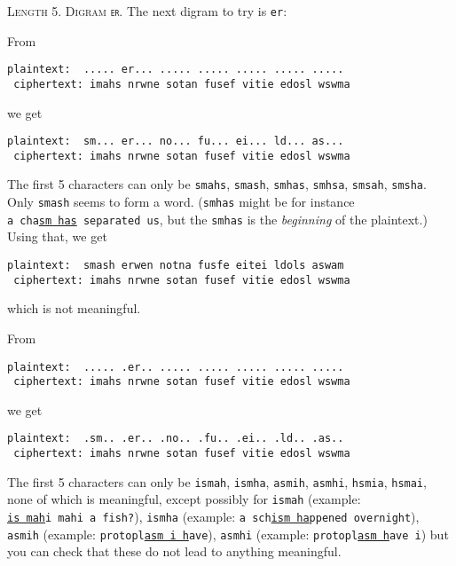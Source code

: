 \textsc{Length 5. Digram \texttt{er}.}
The next digram to try is \verb!er!:
\begin{itemize}
  \li From
  \begin{Verbatim}[commandchars=\\\{\}]
 plaintext:  ..... er... ..... ..... ..... ..... .....
 ciphertext: imahs nrwne sotan fusef vitie edosl wswma
\end{Verbatim}
we get
  \begin{Verbatim}[commandchars=\\\{\}]
 plaintext:  sm... er... no... fu... ei... ld... as...
 ciphertext: imahs nrwne sotan fusef vitie edosl wswma
\end{Verbatim}
The first 5 characters can only be
\verb!smahs!,
\verb!smash!,
\verb!smhas!,
\verb!smhsa!,
\verb!smsah!,
\verb!smsha!. Only \verb!smash! seems to form a word.
(\verb!smhas! might be for instance \texttt{a\ cha\underline{sm\ has}\ separated\ us},
but the \verb!smhas! is the \textit{beginning} of the plaintext.)
Using that, we get
  \begin{Verbatim}[commandchars=\\\{\}]
 plaintext:  smash erwen notna fusfe eitei ldols aswam
 ciphertext: imahs nrwne sotan fusef vitie edosl wswma
\end{Verbatim}
which is not meaningful.

  \li From
  \begin{Verbatim}[commandchars=\\\{\}]
 plaintext:  ..... .er.. ..... ..... ..... ..... .....
 ciphertext: imahs nrwne sotan fusef vitie edosl wswma
\end{Verbatim}
we get
  \begin{Verbatim}[commandchars=\\\{\}]
 plaintext:  .sm.. .er.. .no.. .fu.. .ei.. .ld.. .as..
 ciphertext: imahs nrwne sotan fusef vitie edosl wswma
\end{Verbatim}
The first 5 characters can only be
\verb!ismah!,
\verb!ismha!,
\verb!asmih!,
\verb!asmhi!,
\verb!hsmia!,
\verb!hsmai!,
none of which is meaningful,
except possibly for
\verb!ismah! (example: \texttt{\underline{is\ mah}i\ mahi\ a\ fish?}),
\verb!ismha! (example: \texttt{a sch\underline{ism\ ha}ppened overnight}),
\verb!asmih! (example: \texttt{protopl\underline{asm i h}ave}),
\verb!asmhi! (example: \texttt{protopl\underline{asm h}ave i})
but you can check that these do not lead
to anything meaningful.



\end{itemize}
